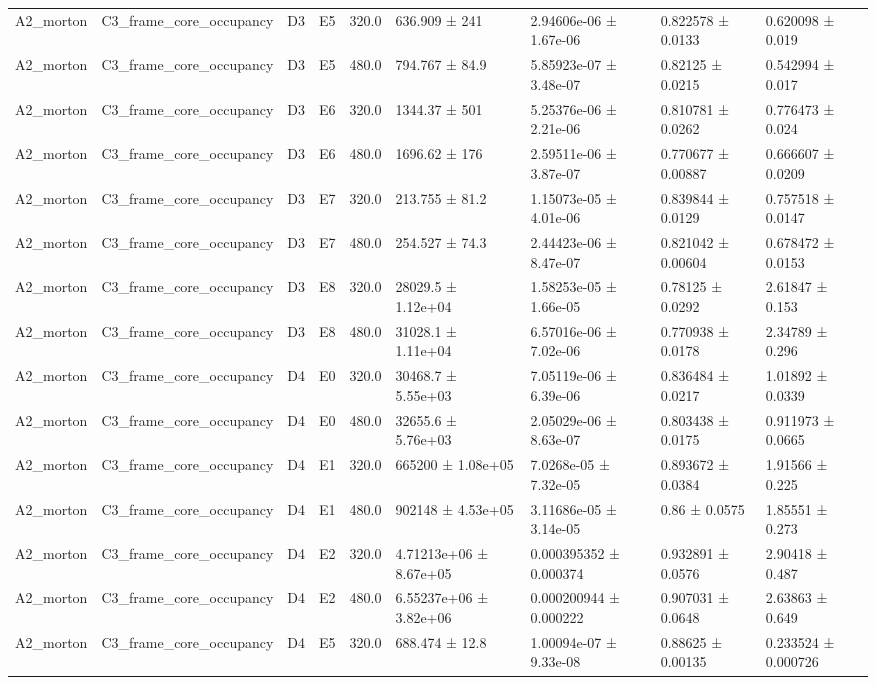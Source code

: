 \begin{table}
\begin{tabular}{lllllllll}
A2\_morton & C3\_frame\_core\_occupancy & D3 & E5 & 320.0 & 636.909 ± 241 & 2.94606e-06 ± 1.67e-06 & 0.822578 ± 0.0133 & 0.620098 ± 0.019 \\
A2\_morton & C3\_frame\_core\_occupancy & D3 & E5 & 480.0 & 794.767 ± 84.9 & 5.85923e-07 ± 3.48e-07 & 0.82125 ± 0.0215 & 0.542994 ± 0.017 \\
A2\_morton & C3\_frame\_core\_occupancy & D3 & E6 & 320.0 & 1344.37 ± 501 & 5.25376e-06 ± 2.21e-06 & 0.810781 ± 0.0262 & 0.776473 ± 0.024 \\
A2\_morton & C3\_frame\_core\_occupancy & D3 & E6 & 480.0 & 1696.62 ± 176 & 2.59511e-06 ± 3.87e-07 & 0.770677 ± 0.00887 & 0.666607 ± 0.0209 \\
A2\_morton & C3\_frame\_core\_occupancy & D3 & E7 & 320.0 & 213.755 ± 81.2 & 1.15073e-05 ± 4.01e-06 & 0.839844 ± 0.0129 & 0.757518 ± 0.0147 \\
A2\_morton & C3\_frame\_core\_occupancy & D3 & E7 & 480.0 & 254.527 ± 74.3 & 2.44423e-06 ± 8.47e-07 & 0.821042 ± 0.00604 & 0.678472 ± 0.0153 \\
A2\_morton & C3\_frame\_core\_occupancy & D3 & E8 & 320.0 & 28029.5 ± 1.12e+04 & 1.58253e-05 ± 1.66e-05 & 0.78125 ± 0.0292 & 2.61847 ± 0.153 \\
A2\_morton & C3\_frame\_core\_occupancy & D3 & E8 & 480.0 & 31028.1 ± 1.11e+04 & 6.57016e-06 ± 7.02e-06 & 0.770938 ± 0.0178 & 2.34789 ± 0.296 \\
A2\_morton & C3\_frame\_core\_occupancy & D4 & E0 & 320.0 & 30468.7 ± 5.55e+03 & 7.05119e-06 ± 6.39e-06 & 0.836484 ± 0.0217 & 1.01892 ± 0.0339 \\
A2\_morton & C3\_frame\_core\_occupancy & D4 & E0 & 480.0 & 32655.6 ± 5.76e+03 & 2.05029e-06 ± 8.63e-07 & 0.803438 ± 0.0175 & 0.911973 ± 0.0665 \\
A2\_morton & C3\_frame\_core\_occupancy & D4 & E1 & 320.0 & 665200 ± 1.08e+05 & 7.0268e-05 ± 7.32e-05 & 0.893672 ± 0.0384 & 1.91566 ± 0.225 \\
A2\_morton & C3\_frame\_core\_occupancy & D4 & E1 & 480.0 & 902148 ± 4.53e+05 & 3.11686e-05 ± 3.14e-05 & 0.86 ± 0.0575 & 1.85551 ± 0.273 \\
A2\_morton & C3\_frame\_core\_occupancy & D4 & E2 & 320.0 & 4.71213e+06 ± 8.67e+05 & 0.000395352 ± 0.000374 & 0.932891 ± 0.0576 & 2.90418 ± 0.487 \\
A2\_morton & C3\_frame\_core\_occupancy & D4 & E2 & 480.0 & 6.55237e+06 ± 3.82e+06 & 0.000200944 ± 0.000222 & 0.907031 ± 0.0648 & 2.63863 ± 0.649 \\
A2\_morton & C3\_frame\_core\_occupancy & D4 & E5 & 320.0 & 688.474 ± 12.8 & 1.00094e-07 ± 9.33e-08 & 0.88625 ± 0.00135 & 0.233524 ± 0.000726 \\

\end{tabular}
\end{table}
